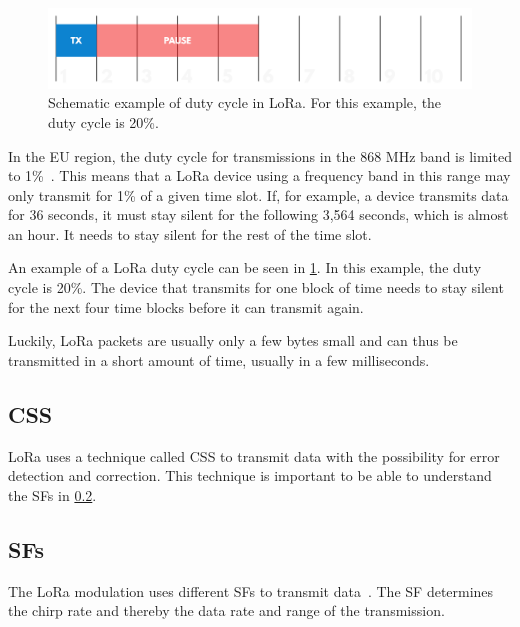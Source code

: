 \begin{figure}[htbp]
    \centering
    \includegraphics[width=.8\textwidth]{pictures/lora/duty-cycle-single-channel-off-air.png}
    \caption{
        Schematic example of duty cycle in \ac{LoRa}.
        For this example, the duty cycle is 20\%.~\protect\cite{the_things_industries_bv_duty_nodate}
    }\label{pic:lora-duty-cycle}
\end{figure}

In the \ac{EU} region, the duty cycle for transmissions in the 868 MHz band is limited to 1\%~\cite{etsi_etsi_2012}.
This means that a \ac{LoRa} device using a frequency band in this range may only transmit for 1\% of a given time slot.
If, for example, a device transmits data for 36 seconds, it must stay silent for the following 3,564 seconds, which is almost an hour.
It needs to stay silent for the rest of the time slot.

An example of a \ac{LoRa} duty cycle can be seen in \cref{pic:lora-duty-cycle}.
In this example, the duty cycle is 20\%.
The device that transmits for one block of time needs to stay silent for the next four time blocks before it can transmit again.

Luckily, LoRa packets are usually only a few bytes small and can thus be transmitted in a short amount of time, usually in a few milliseconds.

\subsection{\acf{CSS}}\label{sec:chirp-spread-spectrum}

\ac{LoRa} uses a technique called \acl{CSS} to transmit data with the possibility for error detection and correction.
This technique is important to be able to understand the \aclp{SF} in \cref{sec:spreading-factors}.


\subsection{\acfp{SF}}\label{sec:spreading-factors}

The \ac{LoRa} modulation uses different \acfp{SF} to transmit data~\cite{the_things_network_spreading_2023}.
The \acl{SF} determines the chirp rate and thereby the data rate and range of the transmission.

